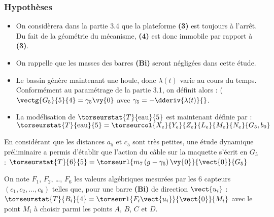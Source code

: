 \subsubsection*{Hypothèses}
\begin{itemize}
    \item On considèrera dans la partie 3.4 que la plateforme \textbf{(3)} est toujours à l’arrêt. Du fait de la géométrie du mécanisme, \textbf{(4)} est donc immobile par rapport à \textbf{(3)}.
    \item On rappelle que les masses des barres \textbf{(Bi)} seront négligées dans cette étude.
    \item Le bassin génère maintenant une houle, donc $\lambda(t)$ varie au cours du temps. Conformément au paramétrage de la partie 3.1, on définit alors : ($\vectg{G_5}{5}{4}=\gamma_5 \vy{0}$ avec $\gamma_5=- \dderiv{\lambda(t)}{}$.
    \item La modélisation de $\torseurstat{T}{\text{eau}}{5}$ est maintenant définie par :
    $\torseurstat{T}{\text{eau}}{5} =  \torseurcol{X_e}{Y_e}{Z_e}{L_e}{M_e}{N_e}{G_5,b_0}$ 
\end{itemize}



En considérant que les distances $a_5$ et $c_5$ sont très petites, une étude dynamique préliminaire a permis d’établir que l’action du câble sur la maquette s’écrit en $G_5$ : $\torseurstat{T}{6}{5}= \torseurl{m_7 \left(g-\gamma_5\right) \vy{0}}{\vect{0}}{G_5}$




On note $F_1$, $F_2$, …, $F_6$ les valeurs algébriques mesurées par les 6 capteurs  $\left(c_1, c_2, ..., c_6\right)$ telles que, pour une barre \textbf{(Bi)} de direction $\vect{u_i}$ :  $\torseurstat{T}{B_i}{4}=\torseurl{F_i \vect{u_i}}{\vect{0}}{M_i}$  avec le point $M_i$ à choisir parmi les points $A$, $B$, $C$ et $D$.

